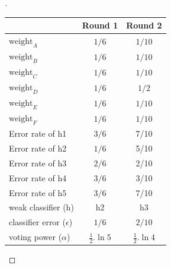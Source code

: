 \documentclass[a4paper, 12pt]{article}
\begin{document}
\begin{proof}[]
\begin{enumerate}[label={\color{blue}{\textbf{3.\arabic*})}}]
        \begin{center}
            \begin{tabular}{|l|c|c|}
            \hline
                                & Round 1 & Round 2 \\ \hline
            $\text{weight}_A$              &    $1/6$     &     
            $1/10$              \\ \hline
            $\text{weight}_B$              &    $1/6$     &    $1/10$       \\\hline
            $\text{weight}_C$              &    $1/6$     &    $1/10$       \\\hline
            $\text{weight}_D$              &    $1/6$     &    $1/2$      \\\hline
            $\text{weight}_E$              &    $1/6$     &    $1/10$       \\\hline
            $\text{weight}_F$              &    $1/6$     &    $1/10$       \\\hline\hline
            Error rate of h1    &    $3/6$     &  7/10       \\\hline
            Error rate of h2    &    $1/6$     &  5/10       \\\hline
            Error rate of h3    &    $2/6$     &  2/10       \\\hline
            Error rate of h4    &    $3/6$     &  3/10       \\\hline
            Error rate of h5    &    $3/6$     &  7/10       \\\hline\hline
            weak classifier (h) &   h2  &     h3    \\\hline
            classifier error ($\epsilon$) &    $1/6$     &   $2/10$      \\\hline
            voting power ($\alpha$)        &    
                $\frac{1}{2}.\ln{5}$ 
            &     $\frac{1}{2}.\ln{4}$      \\ \hline
            \end{tabular}
        \end{center}
        

\end{enumerate}
\end{proof}
\end{document}
